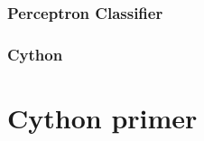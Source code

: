 \documentclass[11pt]{article}
\begin{document}
\subsubsection{Perceptron Classifier}
\label{sec-7-2-2}
\subsubsection{Cython}
\label{sec-7-2-3}

    
\section{Cython primer}
\label{sec-8}
\end{document}
